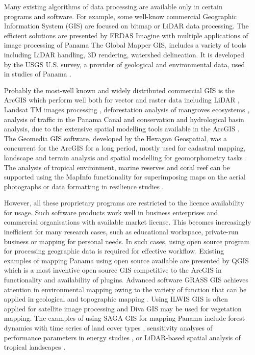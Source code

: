\documentclass[USenglish,twocolumn]{article}
\begin{document}
Many existing algorithms of data processing are available only in certain programs and software. For example, some well-know commercial Geographic Information System (GIS) are focused on bitmap or LiDAR data processing. The efficient solutions are presented by ERDAS Imagine with multiple applications of image processing of Panama \citep{Guzman,SANCHEZAZOFEIFA20092076,PORTILLOQUINTERO2010144}
The Global Mapper GIS, includes a variety of tools including LiDAR handling, 3D rendering, watershed delineation. It is developed by the USGS U.S. survey, a provider of geological and environmental data, used in studies of Panama \citep{WALKER2021105632,HOPP2016187,ODEA201259}. 

Probably the most-well known and widely distributed commercial GIS is the ArcGIS which perform well both for vector and raster data including LiDAR \citep{HIGGINS2014358}, Landsat TM images processing \citep{SESNIE20082145}, deforestation analysis of mangroves ecosystems \citep{LOPEZANGARITA201882,MEJIARENTERIA2018233}, analysis of traffic in the Panama Canal and conservation \citep{GUZMAN2020104113,DARIEN2021105490,ROMPRE2008129} and hydrological basin analysis, due to the extensive spatial modelling tools available in the ArcGIS \citep{SALGADO2020138444,PEREZCONSUEGRA2021107590}. The Geomedia GIS software, developed by the Hexagon Geospatial, was a concurrent for the ArcGIS for a long period, mostly used for cadastral mapping, landscape and terrain analysis and spatial modelling for geomorphometry tasks \citep{KLINGSEISEN2008109}. The analysis of tropical environment, marine reserves and coral reef can be supported using the MapInfo functionality for superimposing maps on the aerial photographs \citep{Chapman} or data formatting in resilience studies \citep{HERMIDA2017467}.

However, all these proprietary programs are restricted to the licence availability for usage. Such software products work well in business enterprises and commercial organisations with available market license. This becomes increasingly inefficient for many research cases, such as educational workspace, private-run business or mapping for personal needs. In such cases, using open source program for processing geographic data is required for effective workflow. Existing examples of mapping Panama using open source available are presented by QGIS \citep{VARDEMAN2020e01098,Bennett,YAMADA201642} which is a most inventive open source GIS competitive to the ArcGIS in functionality and availability of plugins. Advanced software GRASS GIS achieves attention in environmental mapping owing to the variety of function that can be applied in geological and topographic mapping \citep{Lemenkova202125}. Using ILWIS GIS is often applied for satellite image processing and Diva GIS may be used for vegetation mapping. The examples of using SAGA GIS for mapping Panama include forest dynamics with time series of land cover types \citep{WALKER2020102029}, sensitivity analyses of performance parameters in energy studies \citep{VERA20201399}, or LiDAR-based spatial analysis of tropical landscapes \citep{GRAVES201832}.
\end{document}
